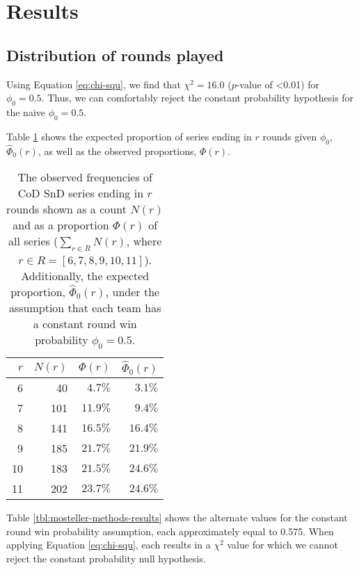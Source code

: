 \documentclass{article}
\begin{document}
\hypertarget{results}{%
\section{Results}\label{results}}

\hypertarget{distribution-of-rounds-played-1}{%
\subsection{Distribution of rounds
played}\label{distribution-of-rounds-played-1}}

Using Equation \ref{eq:chi-squ}, we find that \(\chi^2 = 16.0\)
(\(p\)-value of \textless0.01) for \(\phi_0 = 0.5\). Thus, we can
comfortably reject the constant probability hypothesis for the naive
\(\phi_0 = 0.5\).

Table \ref{tbl:prob-series-lasts-r-rounds} shows the expected proportion
of series ending in \(r\) rounds given \(\phi_0\), \(\hat{\Phi}_0(r)\),
as well as the observed proportions, \(\Phi(r)\).

\begin{table}
\caption{The observed frequencies of CoD SnD series ending in $r$ rounds shown as a count $N(r)$ and as a proportion $\Phi(r)$ of all series ($\sum_{r \in R} N(r)$, where $r \in R = [6, 7, 8, 9, 10, 11]$). Additionally, the expected proportion, $\hat{\Phi}_0(r)$, under the assumption that each team has a constant round win probability $\phi_0 = 0.5$.}

\centering
\begin{tabular}{rrrr}
\toprule
$r$ & $N(r)$ & $\Phi(r)$ & $\hat{\Phi}_0(r)$ \\ 
\midrule

6 & 40 & $4.7\%$ & $3.1\%$ \\ 
7 & 101 & $11.9\%$ & $9.4\%$ \\ 
8 & 141 & $16.5\%$ & $16.4\%$ \\ 
9 & 185 & $21.7\%$ & $21.9\%$ \\ 
10 & 183 & $21.5\%$ & $24.6\%$ \\ 
11 & 202 & $23.7\%$ & $24.6\%$ \\ 

\bottomrule
\end{tabular}

\label{tbl:prob-series-lasts-r-rounds}

\end{table}

Table \ref{tbl:mosteller-methods-results} shows the alternate values for
the constant round win probability assumption, each approximately equal
to 0.575. When applying Equation \ref{eq:chi-squ}, each results in a
\(\chi^2\) value for which we cannot reject the constant probability
null hypothesis.
\end{document}
